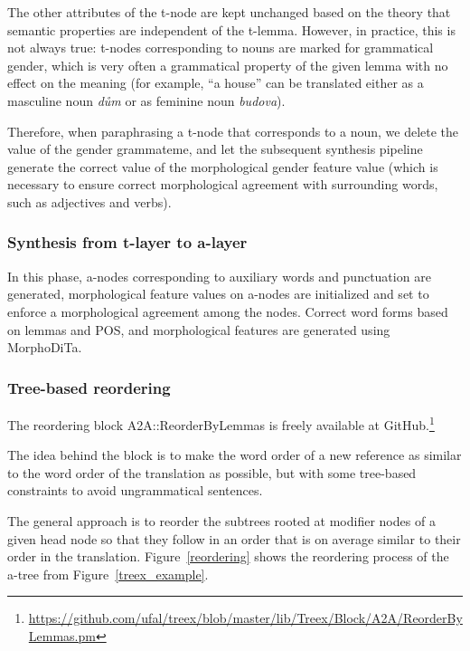 \documentclass[11pt]{article}
\def\Fref#1{Figure~\ref{#1}}
\def\footurl#1{\footnote{\url{#1}}}
\begin{document}
The other attributes of the t-node are kept unchanged based on the theory that
semantic properties are independent of the t-lemma. However, in practice, this 
is not always true: t-nodes corresponding to nouns are marked for grammatical 
gender, which is very often a grammatical property of the given lemma with no 
effect on the meaning (for example, ``a house'' can be translated either as a 
masculine noun \textit{dům} or as feminine noun \textit{budova}).

Therefore, when paraphrasing a t-node that corresponds to a noun, we delete 
the value of the gender grammateme, and let the subsequent synthesis pipeline 
generate the correct value of the morphological gender feature value (which is 
necessary to ensure correct morphological agreement with surrounding words, 
such as adjectives and verbs).

\subsubsection{Synthesis from t-layer to a-layer}
In this phase, a-nodes corresponding to auxiliary words and punctuation are 
generated, morphological feature values on a-nodes are initialized and set to 
enforce a morphological agreement among the nodes. Correct word forms based 
on lemmas and POS, and morphological features are generated using MorphoDiTa.

\subsubsection{Tree-based reordering}
The reordering block A2A::ReorderByLemmas is freely available at 
GitHub.\footurl{https://github.com/ufal/treex/blob/master/lib/Treex/Block/A2A/ReorderByLemmas.pm}

The idea behind the block is to make the word order of a new reference as 
similar to the word order of the translation as possible, but with some 
tree-based constraints to avoid ungrammatical sentences. 

The general approach is to reorder the subtrees rooted at modifier nodes of a 
given head node so that they follow in an order that is on average similar to 
their order in the translation. \Fref{reordering} shows the reordering process 
of the a-tree from \Fref{treex_example}.

\end{document}
